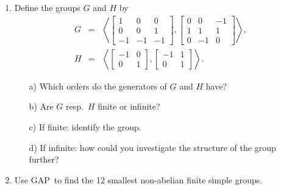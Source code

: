 \documentclass[12pt]{article}
\newcommand{\GAP}{\textsf{GAP}}
\begin{document}
\begin{enumerate}
\item
Define the groups $G$ and $H$ by
\begin{eqnarray*}
G &=& \left<
\left[ \begin{array}{rrr} 1&0&0 \\ 0&0&1 \\ -1&-1&-1 \end{array} \right],
\left[ \begin{array}{rrr} 0&0&-1 \\ 1&1&1 \\ 0&-1&0 \end{array} \right]
\right>, \\
H &=& \left<
\left[ \begin{array}{rr} -1&0 \\ 0&1 \end{array} \right],
\left[ \begin{array}{rr} -1&1 \\ 0&1\end{array} \right]
\right>.
\end{eqnarray*}
\begin{itemize}
\item[a)]
Which orders do the generators of $G$ and $H$ have?
\item[b)]
Are $G$ resp.~$H$ finite or infinite?
\item[c)]
If finite: identify the group.
\item[d)]
If infinite: how could you investigate the structure of the group
further?
\end{itemize}

\item Use \GAP\ to find the 12 smallest non-abelian finite simple
groups.
\end{enumerate}
\end{document}
